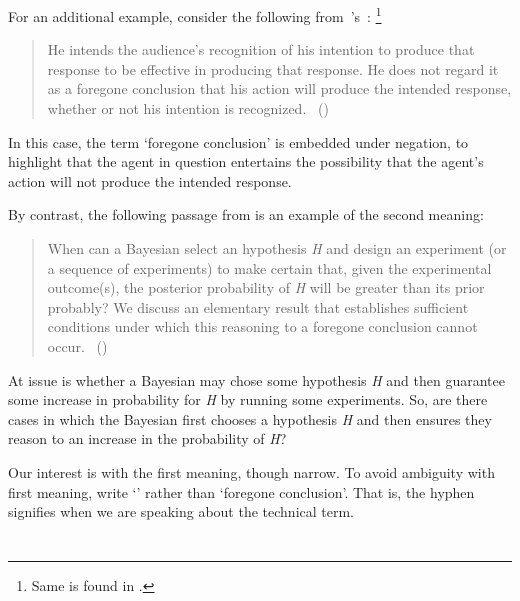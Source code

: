 \begin{note}
  For an additional example, consider the following from~\citeauthor{Grice:1957vg}'s~:%
  \footnote{
    Same is found in \textcite[219]{Grice:1989uf}.
  }
  \begin{quote}
    He intends the audience's recognition of his intention to produce that response to be effective in producing that response.
    He does not regard it as a foregone conclusion that his action will produce the intended response, whether or not his intention is recognized.\newline
    \mbox{ }\hfill\mbox{(\citeyear[385]{Grice:1957vg})}
  \end{quote}

  In this case, the term `foregone conclusion' is embedded under negation, to highlight that the agent in question entertains the possibility that the agent's action will not produce the intended response.

  By contrast, the following passage from \textcite{Kadane:1996vu} is an example of the second meaning:

  \begin{quote}
    When can a Bayesian select an hypothesis \emph{H} and design an experiment (or a sequence of experiments) to make certain that, given the experimental outcome(s), the posterior probability of \emph{H} will be greater than its prior probably?
    We discuss an elementary result that establishes sufficient conditions under which this reasoning to a foregone conclusion cannot occur.%
    \mbox{ }\hfill\mbox{(\citeyear[1228]{Kadane:1996vu})}
  \end{quote}

  At issue is whether a Bayesian may chose some hypothesis \emph{H} and then guarantee some increase in probability for \emph{H} by running some experiments.
  So, are there cases in which the Bayesian first chooses a hypothesis \emph{H} and then ensures they reason to an increase in the probability of \emph{H}?
\end{note}

\begin{note}
  Our interest is with the first meaning, though narrow.
  To avoid ambiguity with first meaning, write `' rather than `foregone conclusion'.
  That is, the hyphen signifies when we are speaking about the technical term.
\end{note}

\section{}
\label{cha:sec:fcs-def}

